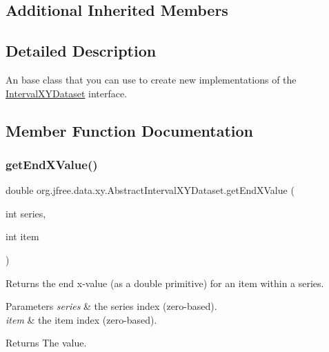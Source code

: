 \subsection*{Additional Inherited Members}


\subsection{Detailed Description}
An base class that you can use to create new implementations of the \mbox{\hyperlink{interfaceorg_1_1jfree_1_1data_1_1xy_1_1_interval_x_y_dataset}{Interval\+X\+Y\+Dataset}} interface. 

\subsection{Member Function Documentation}
\mbox{\label{classorg_1_1jfree_1_1data_1_1xy_1_1_abstract_interval_x_y_dataset_ac91570775b0aff8d6acf1316a87ea551}} 
\subsubsection{\texorpdfstring{get\+End\+X\+Value()}{getEndXValue()}}
{\footnotesize\ttfamily double org.\+jfree.\+data.\+xy.\+Abstract\+Interval\+X\+Y\+Dataset.\+get\+End\+X\+Value (\begin{DoxyParamCaption}\item[{int}]{series,  }\item[{int}]{item }\end{DoxyParamCaption})}

Returns the end x-\/value (as a double primitive) for an item within a series.


\begin{DoxyParams}{Parameters}
{\em series} & the series index (zero-\/based). \\
\hline
{\em item} & the item index (zero-\/based).\\
\hline
\end{DoxyParams}
\begin{DoxyReturn}{Returns}
The value. 
\end{DoxyReturn}


